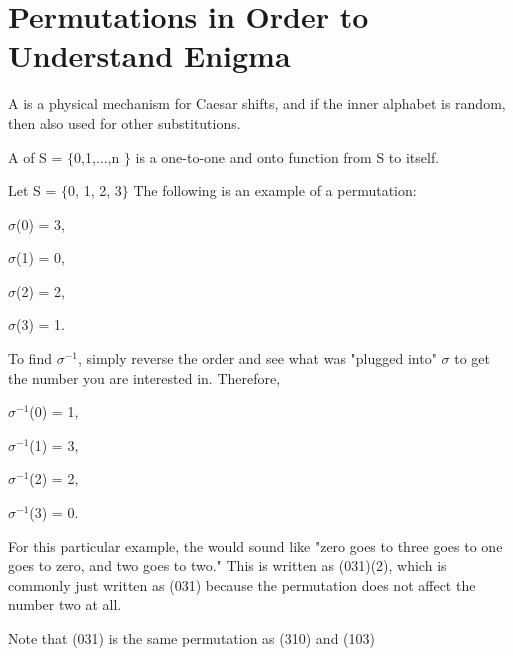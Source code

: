 \section{Permutations in Order to Understand Enigma}
\begin{definition}A  is a physical mechanism for Caesar shifts, and if the inner alphabet is random, then also used for other substitutions. \end{definition}
\begin{definition} A  of S = $\{$0,1,...,n $\}$ is a one-to-one and onto function from S to itself. \end{definition}

\begin{example}
Let S = $\{$0, 1, 2, 3$\}$ The following is an example of a permutation: \par $\sigma$(0) = 3, \par $\sigma$(1) = 0, \par $\sigma$(2) = 2, \par $\sigma$(3) = 1. \par \medspace To find $\sigma^{-1}$, simply reverse the order and see what was "plugged into" $\sigma$ to get the number you are interested in. Therefore, \par $\sigma^{-1}$(0) = 1, \par $\sigma^{-1}$(1) = 3, \par $\sigma^{-1}$(2) = 2, \par $\sigma^{-1}$(3) = 0. \par For this particular example, the  would sound like "zero goes to three goes to one goes to zero, and two goes to two." This is written as (031)(2), which is commonly just written as (031) because the permutation does not affect the number two at all. \par Note that (031) is the same permutation as (310) and (103) \end{example} \par

